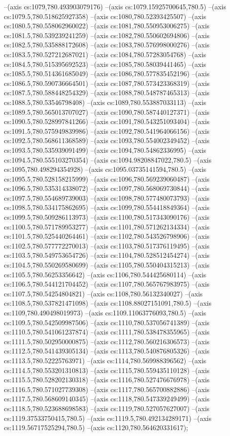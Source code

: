 --(axis cs:1079,780.493903079176)
--(axis cs:1079.15925700645,780.5)
--(axis cs:1079.5,780.518625927358)
--(axis cs:1080,780.52393425507)
--(axis cs:1080.5,780.558062960022)
--(axis cs:1081,780.550953006275)
--(axis cs:1081.5,780.539239241259)
--(axis cs:1082,780.550602694806)
--(axis cs:1082.5,780.535888172608)
--(axis cs:1083,780.576998000276)
--(axis cs:1083.5,780.527212687021)
--(axis cs:1084,780.57283054768)
--(axis cs:1084.5,780.515395692523)
--(axis cs:1085,780.58039441465)
--(axis cs:1085.5,780.514361685049)
--(axis cs:1086,780.577835452196)
--(axis cs:1086.5,780.590736664501)
--(axis cs:1087,780.573423368319)
--(axis cs:1087.5,780.588448254329)
--(axis cs:1088,780.548787465313)
--(axis cs:1088.5,780.53546798408)
--(axis cs:1089,780.553887033113)
--(axis cs:1089.5,780.565013707027)
--(axis cs:1090,780.587440127371)
--(axis cs:1090.5,780.528997841266)
--(axis cs:1091,780.543251093404)
--(axis cs:1091.5,780.575949839986)
--(axis cs:1092,780.541964066156)
--(axis cs:1092.5,780.568611368589)
--(axis cs:1093,780.554002349452)
--(axis cs:1093.5,780.535939091499)
--(axis cs:1094,780.54862336995)
--(axis cs:1094.5,780.555103270354)
--(axis cs:1094.98208847022,780.5)
--(axis cs:1095,780.498294354928)
--(axis cs:1095.03735141594,780.5)
--(axis cs:1095.5,780.528158215999)
--(axis cs:1096,780.569239060487)
--(axis cs:1096.5,780.535314338072)
--(axis cs:1097,780.568069730844)
--(axis cs:1097.5,780.554689739003)
--(axis cs:1098,780.577480073793)
--(axis cs:1098.5,780.534175862695)
--(axis cs:1099,780.554418849364)
--(axis cs:1099.5,780.509286113973)
--(axis cs:1100,780.517343090176)
--(axis cs:1100.5,780.571789953277)
--(axis cs:1101,780.571262134334)
--(axis cs:1101.5,780.525440264461)
--(axis cs:1102,780.543526798906)
--(axis cs:1102.5,780.577772270013)
--(axis cs:1103,780.517376119495)
--(axis cs:1103.5,780.549753654726)
--(axis cs:1104,780.528512454274)
--(axis cs:1104.5,780.550269580699)
--(axis cs:1105,780.550404315213)
--(axis cs:1105.5,780.56253356642)
--(axis cs:1106,780.544425680114)
--(axis cs:1106.5,780.544121704452)
--(axis cs:1107,780.565767983975)
--(axis cs:1107.5,780.54254804821)
--(axis cs:1108,780.56132340027)
--(axis cs:1108.5,780.537821471098)
--(axis cs:1108.88027151091,780.5)
--(axis cs:1109,780.490498019973)
--(axis cs:1109.11063776093,780.5)
--(axis cs:1109.5,780.542509987506)
--(axis cs:1110,780.537056741389)
--(axis cs:1110.5,780.541061237874)
--(axis cs:1111,780.538478355965)
--(axis cs:1111.5,780.502950000875)
--(axis cs:1112,780.560216306573)
--(axis cs:1112.5,780.541439305134)
--(axis cs:1113,780.540876805326)
--(axis cs:1113.5,780.52225763971)
--(axis cs:1114,780.569988396562)
--(axis cs:1114.5,780.553201310813)
--(axis cs:1115,780.559435110128)
--(axis cs:1115.5,780.528202130318)
--(axis cs:1116,780.527476676978)
--(axis cs:1116.5,780.571027739308)
--(axis cs:1117,780.565700882886)
--(axis cs:1117.5,780.568609140345)
--(axis cs:1118,780.547339249499)
--(axis cs:1118.5,780.523688698583)
--(axis cs:1119,780.527057627007)
--(axis cs:1119.37533750415,780.5)
--(axis cs:1119.5,780.492134289171)
--(axis cs:1119.56717525294,780.5)
--(axis cs:1120,780.564620331617);
